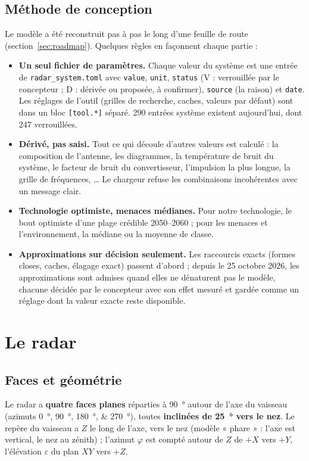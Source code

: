 \documentclass[11pt,a4paper]{article}
\newcommand{\code}[1]{\texttt{\small #1}}
\begin{document}
\subsection{Méthode de conception}
Le modèle a été reconstruit pas à pas le long d'une feuille de route (section~\ref{sec:roadmap}). Quelques règles
en façonnent chaque partie :
\begin{itemize}
  \item \textbf{Un seul fichier de paramètres.} Chaque valeur du système est une entrée de \code{radar\_system.toml}
        avec \code{value}, \code{unit}, \code{status} (V : verrouillée par le concepteur ; D : dérivée ou proposée, à
        confirmer), \code{source} (la raison) et \code{date}. Les réglages de l'outil (grilles de recherche, caches,
        valeurs par défaut) sont dans un bloc \code{[tool.*]} séparé. 290 entrées système existent aujourd'hui, dont
        247 verrouillées.
  \item \textbf{Dérivé, pas saisi.} Tout ce qui découle d'autres valeurs est calculé : la composition de l'antenne, les
        diagrammes, la température de bruit du système, le facteur de bruit du convertisseur, l'impulsion la plus
        longue, la grille de fréquences, \dots{} Le chargeur refuse les combinaisons incohérentes avec un message clair.
  \item \textbf{Technologie optimiste, menaces médianes.} Pour notre technologie, le bout optimiste d'une plage
        crédible 2050--2060 ; pour les menaces et l'environnement, la médiane ou la moyenne de classe.
  \item \textbf{Approximations sur décision seulement.} Les raccourcis exacts (formes closes, caches, élagage exact)
        passent d'abord ; depuis le 25 octobre 2026, les approximations sont admises quand elles ne dénaturent pas le
        modèle, chacune décidée par le concepteur avec son effet mesuré et gardée comme un réglage dont la valeur exacte
        reste disponible.
\end{itemize}

\section{Le radar}

\subsection{Faces et géométrie}
Le radar a \textbf{quatre faces planes} réparties à \SI{90}{\degree} autour de l'axe du vaisseau (azimuts
\SIlist{0;90;180;270}{\degree}), toutes \textbf{inclinées de \SI{25}{\degree} vers le nez}. Le repère du vaisseau a
$Z$ le long de l'axe, vers le nez (modèle « phare » : l'axe est vertical, le nez au zénith) ; l'azimut $\varphi$ est
compté autour de $Z$ de $+X$ vers $+Y$, l'élévation $\varepsilon$ du plan $XY$ vers $+Z$.
\end{document}
